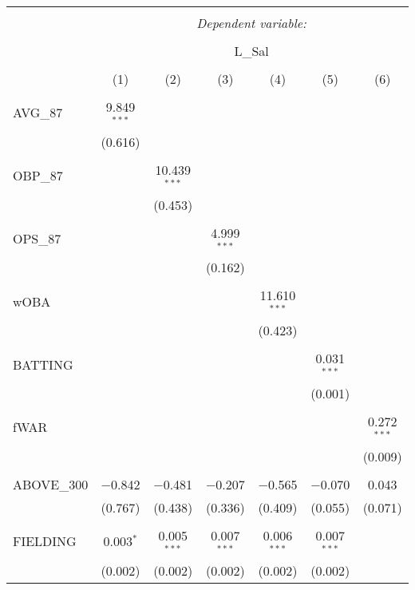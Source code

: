 
\begin{table}[!htbp] \centering
  \caption{}
  \label{}
  \scriptsize
\begin{tabular}{@{\extracolsep{5pt}}lcccccc}
\\[-1.8ex]\hline
\hline \\[-1.8ex]
 & \multicolumn{6}{c}{\textit{Dependent variable:}} \\
\cline{2-7}
\\[-1.8ex] & \multicolumn{6}{c}{L\_Sal} \\
\\[-1.8ex] & (1) & (2) & (3) & (4) & (5) & (6)\\
\hline \\[-1.8ex]
 AVG\_87 & 9.849$^{***}$ &  &  &  &  &  \\
  & (0.616) &  &  &  &  &  \\
  & & & & & & \\
 OBP\_87 &  & 10.439$^{***}$ &  &  &  &  \\
  &  & (0.453) &  &  &  &  \\
  & & & & & & \\
 OPS\_87 &  &  & 4.999$^{***}$ &  &  &  \\
  &  &  & (0.162) &  &  &  \\
  & & & & & & \\
 wOBA &  &  &  & 11.610$^{***}$ &  &  \\
  &  &  &  & (0.423) &  &  \\
  & & & & & & \\
 BATTING &  &  &  &  & 0.031$^{***}$ &  \\
  &  &  &  &  & (0.001) &  \\
  & & & & & & \\
 fWAR &  &  &  &  &  & 0.272$^{***}$ \\
  &  &  &  &  &  & (0.009) \\
  & & & & & & \\
 ABOVE\_300 & $-$0.842 & $-$0.481 & $-$0.207 & $-$0.565 & $-$0.070 & 0.043 \\
  & (0.767) & (0.438) & (0.336) & (0.409) & (0.055) & (0.071) \\
  & & & & & & \\
 FIELDING & 0.003$^{*}$ & 0.005$^{***}$ & 0.007$^{***}$ & 0.006$^{***}$ & 0.007$^{***}$ &  \\
  & (0.002) & (0.002) & (0.002) & (0.002) & (0.002) &  \\

\end{tabular}
\end{table}
